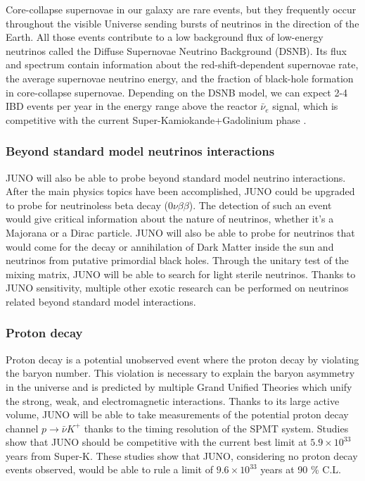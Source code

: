\documentclass[../main.tex]{subfiles}
\begin{document}
Core-collapse supernovae in our galaxy are rare events, but they frequently occur throughout the visible Universe sending bursts of neutrinos in the direction of the Earth. All those events contribute to a low background flux of low-energy neutrinos called the Diffuse Supernovae Neutrino Background (DSNB). Its flux and spectrum contain information about the red-shift-dependent supernovae rate, the average supernovae neutrino energy, and the fraction of black-hole formation in core-collapse supernovae. Depending on the DSNB model, we can expect 2-4 IBD events per year in the energy range above the reactor $\bar{\nu}_e$ signal, which is competitive with the current Super-Kamiokande+Gadolinium phase \cite{collaboration_diffuse_2021}.

\subsubsection{Beyond standard model neutrinos interactions}

JUNO will also be able to probe beyond standard model neutrino interactions. After the main physics topics have been accomplished, JUNO could be upgraded to probe for neutrinoless beta decay ($0\nu\beta\beta$). The detection of such an event would give critical information about the nature of neutrinos, whether it's a Majorana or a Dirac particle. JUNO will also be able to probe for neutrinos that would come for the decay or annihilation of Dark Matter inside the sun and neutrinos from putative primordial black holes.
Through the unitary test of the mixing matrix, JUNO will be able to search for light sterile neutrinos.
Thanks to JUNO sensitivity, multiple other exotic research can be performed on neutrinos related beyond standard model interactions.

\subsubsection{Proton decay}

Proton decay is a potential unobserved event where the proton decay by violating the baryon number. This violation is necessary to explain the baryon asymmetry in the universe and is predicted by multiple Grand Unified Theories which unify the strong, weak, and electromagnetic interactions.
Thanks to its large active volume, JUNO will be able to take measurements of the potential proton decay channel $p \rightarrow \bar{\nu}K^+$ \cite{juno_collaboration_juno_2023} thanks to the timing resolution of the SPMT system. Studies show that JUNO should be competitive with the current best limit at $5.9 \times 10^{33}$ years from Super-K. These studies show that JUNO, considering no proton decay events observed, would be able to rule a limit of $9.6 \times 10^{33}$ years at 90 \% C.L.
\end{document}

